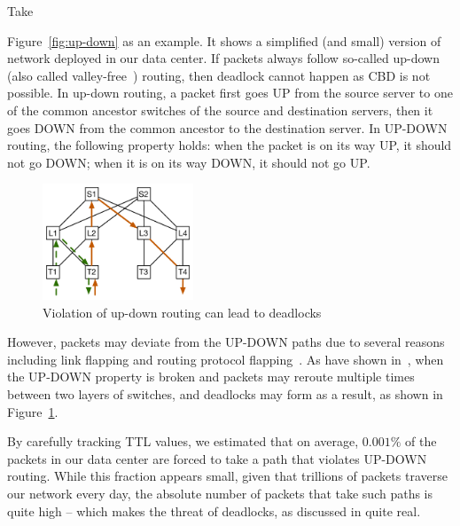 Take {Figure~\ref{fig:up-down} as an example. It shows a simplified (and small) version of
network deployed in our data center. If packets always follow so-called
up-down (also called valley-free~\cite{qiu2007toward}) routing, then deadlock
cannot happen as CBD is not possible. In up-down routing, a packet first goes UP
from the source server to one of the common ancestor switches of the source and
destination servers, then it goes DOWN from the common ancestor to the
destination server.  In UP-DOWN routing, the following property holds: when the
packet is on its way UP, it should not go DOWN; when it is on its way DOWN, it
should not go UP.

\begin{figure}
	\centering
	\includegraphics[width=0.4\textwidth] {figs/up-down}
	\caption{Violation of up-down routing can lead to deadlocks}
	\label{fig:up-down-deadlock}
\end{figure}

However, packets may deviate from the UP-DOWN paths due to several reasons
including link flapping and routing protocol flapping~\cite{f10}. As have shown
in~\cite{shpiner2016unlocking}, when the UP-DOWN property is broken and packets
may reroute multiple times between two layers of switches, and deadlocks may
form as a result, as shown in Figure~\ref{fig:up-down-deadlock}.

By carefully tracking TTL values, we estimated that on average, $0.001\%$ of the
packets in our data center are forced to take a path that violates UP-DOWN
routing.  While this fraction appears small, given that trillions of packets
traverse our network every day, the absolute number of packets that take such
paths is quite high -- which makes the threat of deadlocks, as discussed
in\cite{rdmaatscale,shpiner2016unlocking,hu2016deadlocks} quite real.


}
